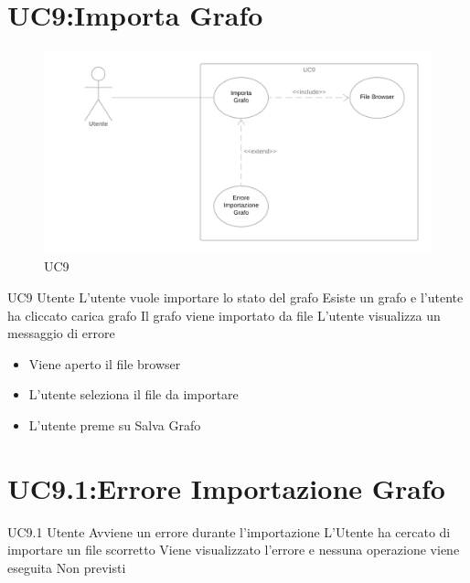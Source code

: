 \documentclass[../AnalisideiRequisiti.tex]{subfiles}
\begin{document}
\section{UC9:Importa Grafo}
\begin{figure}[H]
	\caption{UC9}
	\centering
	\includegraphics[width=\textwidth]{../img/UC09.png}
\end{figure}
\UserCase
{UC9}
{Utente}
{}
{L'utente vuole importare lo stato del grafo}
{Esiste un grafo e l'utente ha cliccato carica grafo}
{Il grafo viene importato da file}
{L'utente visualizza un messaggio di errore }
{
	{\begin{itemize}
			\item{} Viene aperto il file browser
			\item{} L'utente seleziona il file da importare
			\item{} L'utente preme su Salva Grafo
\end{itemize}}}
\section{UC9.1:Errore Importazione Grafo}
\UserCase
{UC9.1}
{Utente}
{}
{Avviene un errore durante l'importazione}
{L'Utente ha cercato di importare un file scorretto}
{Viene visualizzato l'errore e nessuna operazione viene eseguita}
{Non previsti}
{}
\end{document}
